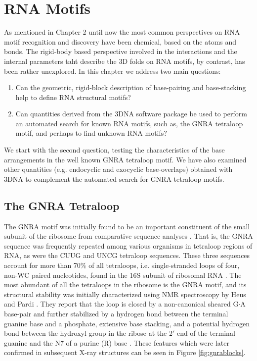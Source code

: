 \chapter{RNA Motifs}
\label{motifs} 

As mentioned  in Chapter 2 until  now the most  common perspectives on
RNA motif recognition  and discovery have been chemical,  based on the
atoms  and bonds.  The  rigid-body based  perspective involved  in the
interactions and the internal parameters taht describe the 3D folds on
RNA motifs, by contrast, has  been rather unexplored.  In this chapter
we address two main questions:

\begin{enumerate}
\item{Can the  geometric, rigid-block description  of base-pairing and
  base-stacking help to define RNA structural motifs?}
\item{Can quantities derived from the 3DNA software package be used to
  perform an automated search for  known RNA motifs, such as, the GNRA
  tetraloop motif, and perhaps to find unknown RNA motifs?}
\end{enumerate}

We start with the second  question, testing the characteristics of the
base arrangements  in the  well known GNRA  tetraloop motif.   We have
also  examined  other   quantities  (e.g.   endocyclic  and  exocyclic
base-overlaps) obtained with 3DNA \cite{lu2003, lu2008b} to complement
the automated search for GNRA tetraloop motifs.

\section{The GNRA Tetraloop}
The GNRA motif  was initially found to be  an important constituent of
the small  subunit of the ribosome from  comparative sequence analyses
\cite{woese1990}. That  is, the GNRA sequence  was frequently repeated
among various organisms in tetraloop  regions of RNA, as were the CUUG
and UNCG  tetraloop sequences. These three sequences  account for more
than  70\% of  all tetraloops,  i.e.  single-stranded  loops  of four,
non-WC paired nucleotides,  found in the 16S subunit  of ribosomal RNA
\cite{woese1990, depaul2010}.  The most abundant of all the tetraloops
in the  ribosome is the GNRA  motif, and its  structural stability was
initially  characterized  using NMR  spectroscopy  by  Heus and  Pardi
\cite{heus1991}.   They   report  that  the   loop  is  closed   by  a
non-canonical sheared G$\cdot$A base-pair  and further stabilized by a
hydrogen  bond between  the  terminal guanine  base  and a  phosphate,
extensive  base stacking, and  a potential  hydrogen bond  between the
hydroxyl group in  the ribose at the 2$'$ end  of the terminal guanine
and the N7 of a  purine (R) base \cite{heus1991}. These features which
were later  confirmed in subsequent  X-ray structures \cite{pley1994b}
can be seen in Figure \ref{fig:gnrablocks}.


